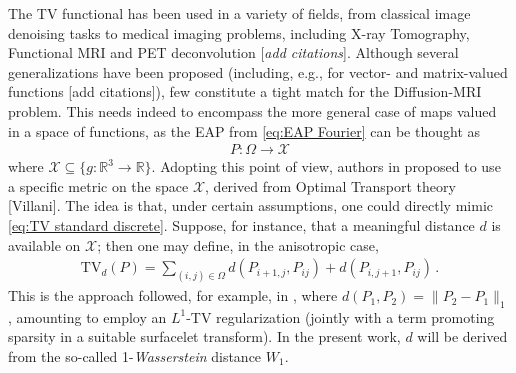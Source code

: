 \documentclass[journal,twoside,web]{ieeecolor}
\newcommand{\R}{\mathbb{R}}
\begin{document}
The TV functional has been used in a variety of fields, from classical image denoising tasks to medical imaging problems, including X-ray Tomography, Functional MRI and PET deconvolution [\textit{add citations}]. Although several generalizations have been proposed (including, e.g., for vector- and matrix-valued functions [add citations]), few constitute a tight match for the Diffusion-MRI problem. This needs indeed to encompass the more general case of maps valued in a space of functions, as the EAP from \eqref{eq:EAP Fourier} can be thought as
\begin{align}
    P : \Omega \to \mathcal{X}
\end{align}
where $\mathcal{X} \subseteq \{ g: \R^3 \to \R\}$. Adopting this point of view, authors in \cite{TVW_Theory} proposed to use a specific metric on the space $\mathcal{X}$, derived from Optimal Transport theory [Villani]. The idea is that, under certain assumptions, one could directly mimic \eqref{eq:TV standard discrete}. Suppose, for instance, that a meaningful distance $d$ is available on $\mathcal{X}$; then one may define, in the anisotropic case,
\begin{align} \label{eq:TV^a_d}
    \mathrm{TV}_d(P) = \sum_{(i,j)\in\Omega} d(P_{i+1,j},P_{ij}) + d(P_{i,j+1},P_{ij}) \, .
\end{align}
This is the approach followed, for example, in \cite{LeveragingEAP}, where $d(P_1,P_2) = \| P_2 - P_1 \|_1$, amounting to employ an $L^1$-TV regularization (jointly with a term promoting sparsity in a suitable surfacelet transform). In the present work, $d$ will be derived from the so-called 1-\textit{Wasserstein} distance $W_1$.
\end{document}
